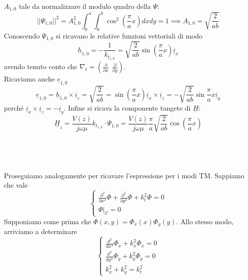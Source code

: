 \documentclass{book}
\begin{document}
    $A_{1,0}$ tale da normalizzare il modulo quadro della $\Psi$:
    \begin{equation}
        ||\Psi_{1,0}|| ^{2} = A_{1,0} ^{2} \int_{0} ^{a} \int_{0} ^{b} \cos^{2}(\frac{\pi}{a}x)dxdy = 1 \implies A_{1,0} = \sqrt{\frac{2}{ab}}
    \end{equation}
    Conoscendo $\Psi_{1,0}$ si ricavano le relative funzioni vettoriali di modo
    \begin{equation}
        \underline{h}_{1,0} = -\frac{1}{k_{t_{1,0}}} = \sqrt{\frac{2}{ab}} \sin(\frac{\pi}{a}x)\underline{i}_{x}
    \end{equation}
    avendo tenuto conto che $\nabla_{t} = (\frac{\partial}{\partial x} \ \ \frac{\partial}{\partial y})$. \\
    Ricaviamo anche $\underline{e}_{1,0}$
    \begin{equation}
        \underline{e}_{1,0} = \underline{h}_{1,0} \times \underline{i}_{z} = \sqrt{\frac{2}{ab}} = \sin(\frac{\pi}{a}x)\underline{i}_{x} \times \underline{i}_{z} = -\sqrt{\frac{2}{ab}}\sin{\frac{\pi}{a}x}\underline{i}_{y}
    \end{equation}
    perché $\underline{i}_{x}\times\underline{i}_{z} = - \underline{i}_{y}$. Infine si ricava 
    la componente tangete di $\underline{H}$:
    \begin{equation}
        \underline{H}_{z} = \frac{V(z)}{j \omega \mu}k_{t_{1,0}} \cdot \Psi_{1,0} = \frac{V(z)}{j \omega \mu} \frac{\pi}{a}\sqrt{\frac{2}{ab}}\cos(\frac{\pi}{a}x)
    \end{equation} \\ \\ \\ \\
    Proseguiamo analogamente per ricavare l'espressione per i modi TM. Sappiamo che vale
    \begin{equation}
        \begin{cases}
            \frac{\partial ^{2}}{\partial x^{2}}\Phi + \frac{\partial ^{2}}{\partial y^{2}}\Phi +k_{t} ^{2}\Phi = 0 \\
            \Phi|_{\mathcal{C}} = 0
        \end{cases}
    \end{equation}
    Supponiamo come prima che $\Phi(x,y) = \Phi_{x}(x)\Phi_{y}(y)$. Allo stesso modo, arriviamo a determinare
    \begin{equation}
        \begin{cases}  
        \frac{d ^{2}}{dx ^{2}}\Phi_{x}+k_{x} ^{2}\Phi_{x} = 0 \\
        \frac{d^{2}}{dy^{2}}\Phi_{y}+k_{y} ^{2}\Phi_{y} = 0 \\
        k_{x} ^{2}+k_{y} ^{2}=k_{t} ^{2}
        \end{cases}
    \end{equation}
\end{document}
